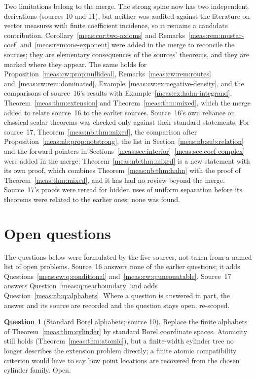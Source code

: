 \documentclass[11pt]{article}
\numberwithin{equation}{section}
\theoremstyle{definition}
\newtheorem{question}[theorem]{Question}
\theoremstyle{remark}
\begin{document}
Two limitations belong to the merge. The strong spine now has two independent
derivations (sources 10 and 11), but neither was audited against the literature on
vector measures with finite coefficient incidence, so it remains a candidate
contribution. Corollary~\ref{meas:cor:two-axioms} and
Remarks~\ref{meas:rem:mustar-coef} and~\ref{meas:rem:one-exponent} were added in the
merge to reconcile the sources; they are elementary consequences of the sources'
theorems, and they are marked where they appear. The same holds for
Proposition~\ref{meas:cw:prop:nullideal}, Remarks~\ref{meas:cw:rem:routes}
and~\ref{meas:cw:rem:dominated}, Example~\ref{meas:cw:ex:negative-density}, and the
comparisons of source~16's results with Example~\ref{meas:ex:hahn-integrand},
Theorem~\ref{meas:thm:extension} and Theorem~\ref{meas:thm:mixed}, which the
merge added to relate source~16 to the earlier sources. Source~16's own
reliance on classical scalar theorems was checked only against their standard
statements. For source~17, Theorem~\ref{meas:nb:thm:mixed}, the comparison after
Proposition~\ref{meas:nb:prop:notstrong}, the list in
Section~\ref{meas:nb:sub:relation} and the forward pointers in
Sections~\ref{meas:sec:interior}--\ref{meas:sec:coef-complex} were added in the
merge; Theorem~\ref{meas:nb:thm:mixed} is a new statement with its own proof, which
combines Theorem~\ref{meas:nb:thm:hahn} with the proof of
Theorem~\ref{meas:thm:mixed}, and it has had no review beyond the merge.
Source~17's proofs were reread for hidden uses of uniform separation before its
theorems were related to the earlier ones; none was found.

\section{Open questions}\label{meas:sec:questions}

The questions below were formulated by the five sources, not taken from a named
list of open problems. Source~16 answers none of the earlier questions; it adds
Questions~\ref{meas:cw:q:conditional} and~\ref{meas:cw:q:uncountable}. Source~17
answers Question~\ref{meas:q:nearboundary} and adds
Question~\ref{meas:nb:q:alphabets}. Where a question is answered in part, the answer and its
source are recorded and the question stays open, re-scoped.

\begin{question}[Standard Borel alphabets; source 10]\label{meas:q:borel}
Replace the finite alphabets of Theorem~\ref{meas:thm:cylinder} by standard Borel
coordinate spaces. Atomicity still holds (Theorem~\ref{meas:thm:atomic}), but a
finite-width cylinder tree no longer describes the extension problem directly; a
finite atomic compatibility criterion would have to say how point locations are
recovered from the chosen cylinder family. Open.
\end{question}
\end{document}
